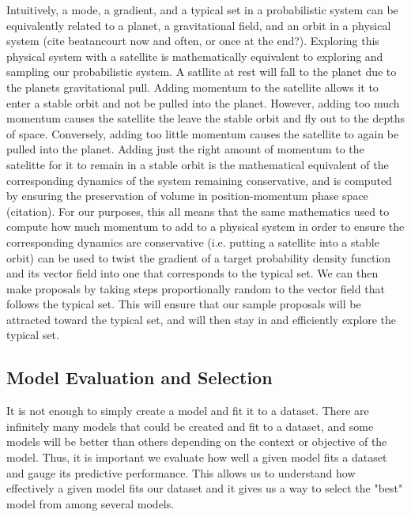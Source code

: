 Intuitively, a mode, a gradient, and a typical set in a probabilistic system can be equivalently related to a planet, a gravitational field, and an orbit in a physical system (cite beatancourt now and often, or once at the end?). Exploring this physical system with a satellite is mathematically equivalent to exploring and sampling our probabilistic system. A satllite at rest will fall to the planet due to the planets gravitational pull. Adding momentum to the satellite allows it to enter a stable orbit and not be pulled into the planet. However, adding too much momentum causes the satellite the leave the stable orbit and fly out to the depths of space. Conversely, adding too little momentum causes the satellite to again be pulled into the planet. Adding just the right amount of momentum to the satelitte for it to remain in a stable orbit is the mathematical equivalent of the corresponding dynamics of the system remaining conservative, and is computed by ensuring the preservation of volume in position-momentum phase space (citation). For our purposes, this all means that the same mathematics used to compute how much momentum to add to a physical system in order to ensure the corresponding dynamics are conservative (i.e. putting a satellite into a stable orbit) can be used to twist the gradient of a target probability density function and its vector field into one that corresponds to the typical set. We can then make proposals by taking steps proportionally random to the vector field that follows the typical set. This will ensure that our sample proposals will be attracted toward the typical set, and will then stay in and efficiently explore the typical set.

\subsection{Model Evaluation and Selection}

It is not enough to simply create a model and fit it to a dataset. There are infinitely many models that could be created and fit to a  dataset, and some models will be better than others depending on the context or objective of the model. Thus, it is important we evaluate how well a given model fits a dataset and gauge its predictive performance. This allows us to understand how effectively a given model fits our dataset and it gives us a way to select the "best" model from among several models.

